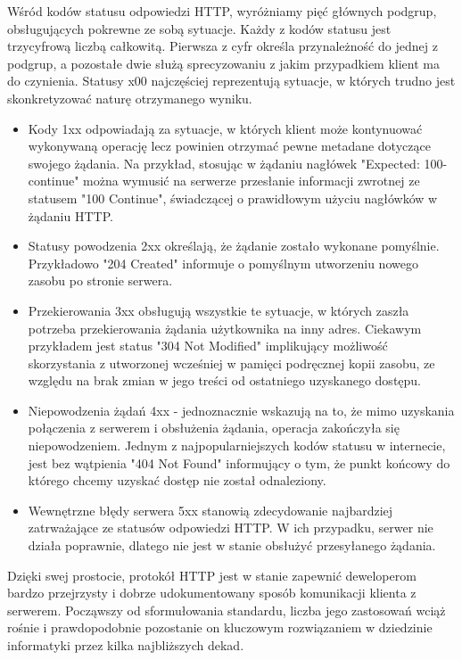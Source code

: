 Wśród kodów statusu odpowiedzi HTTP, wyróżniamy pięć głównych podgrup, obsługujących pokrewne ze sobą sytuacje. Każdy z kodów statusu jest trzycyfrową liczbą całkowitą. Pierwsza z cyfr określa przynależność do jednej z podgrup, a pozostałe dwie służą sprecyzowaniu z jakim przypadkiem klient ma do czynienia. Statusy x00 najczęściej reprezentują sytuacje, w których trudno jest skonkretyzować naturę otrzymanego wyniku.

\begin{itemize}
    \item Kody 1xx odpowiadają za sytuacje, w których klient może kontynuować wykonywaną operację lecz powinien otrzymać pewne metadane dotyczące swojego żądania. Na przykład, stosując w żądaniu nagłówek "Expected: 100-continue" można wymusić na serwerze przesłanie informacji zwrotnej ze statusem "100 Continue", świadczącej o prawidłowym użyciu nagłówków w żądaniu HTTP.
    \item Statusy powodzenia 2xx określają, że żądanie zostało wykonane pomyślnie. Przykładowo "204 Created" informuje o pomyślnym utworzeniu nowego zasobu po stronie serwera.
    \item Przekierowania 3xx obsługują wszystkie te sytuacje, w których zaszła potrzeba przekierowania żądania użytkownika na inny adres. Ciekawym przykładem jest status "304 Not Modified" implikujący możliwość skorzystania z utworzonej wcześniej w pamięci podręcznej kopii zasobu, ze względu na brak zmian w jego treści od ostatniego uzyskanego dostępu.
    \item Niepowodzenia żądań 4xx - jednoznacznie wskazują na to, że mimo uzyskania połączenia z serwerem i obsłużenia żądania, operacja zakończyła się niepowodzeniem. Jednym z najpopularniejszych kodów statusu w internecie, jest bez wątpienia "404 Not Found" informujący o tym, że punkt końcowy do którego chcemy uzyskać dostęp nie został odnaleziony. 
    \item Wewnętrzne błędy serwera 5xx stanowią zdecydowanie najbardziej zatrważające ze statusów odpowiedzi HTTP. W ich przypadku, serwer nie działa poprawnie, dlatego nie jest w stanie obsłużyć przesyłanego żądania. 
\end{itemize}

Dzięki swej prostocie, protokół HTTP jest w stanie zapewnić deweloperom bardzo przejrzysty i dobrze udokumentowany sposób komunikacji klienta z serwerem. Począwszy od sformułowania standardu, liczba jego zastosowań wciąż rośnie i prawdopodobnie pozostanie on kluczowym rozwiązaniem w dziedzinie informatyki przez kilka najbliższych dekad.

